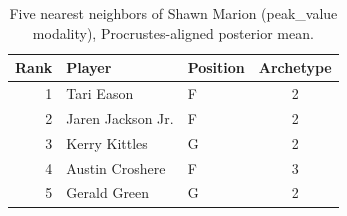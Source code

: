 \begin{table}[htbp]
  \centering\small
  \begin{tabular}{rllc}
    \toprule
    Rank & Player & Position & Archetype \\
    \midrule
    1 & Tari Eason & F & 2 \\
    2 & Jaren Jackson Jr. & F & 2 \\
    3 & Kerry Kittles & G & 2 \\
    4 & Austin Croshere & F & 3 \\
    5 & Gerald Green & G & 2 \\
    \bottomrule
  \end{tabular}
  \caption{Five nearest neighbors of Shawn Marion (peak_value modality), Procrustes-aligned posterior mean.}
  \label{tab:Shawn_Marion_neighbors_peak_value}
\end{table}

